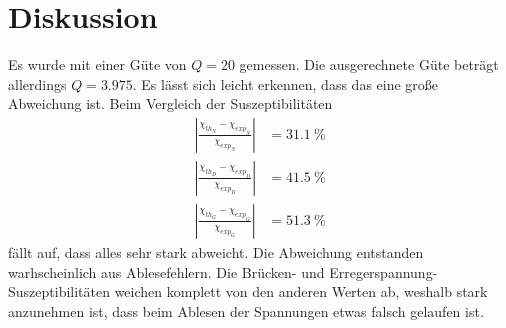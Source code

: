 \section{Diskussion}
\label{sec:Diskussion}

Es wurde mit einer Güte von $Q=20$ gemessen. Die ausgerechnete Güte beträgt allerdings $Q=3.975$. Es lässt sich leicht erkennen, dass das eine große Abweichung ist. 
Beim Vergleich der Suszeptibilitäten 
\begin{align*}
  |\frac{\chi_{th_{N}}-\chi_{exp_{N}}}{\chi_{exp_{N}}}|&=31.1\ \%\\
  |\frac{\chi_{th_{D}}-\chi_{exp_{D}}}{\chi_{exp_{D}}}|&=41.5\ \%\\
  |\frac{\chi_{th_{G}}-\chi_{exp_{G}}}{\chi_{exp_{G}}}|&=51.3\ \%
\end{align*}
fällt auf, dass alles sehr stark abweicht. Die Abweichung entstanden warhscheinlich aus Ablesefehlern. Die Brücken- und Erregerspannung-Suszeptibilitäten weichen komplett von den anderen Werten ab, weshalb stark anzunehmen ist, dass beim Ablesen der Spannungen etwas falsch gelaufen ist. 
